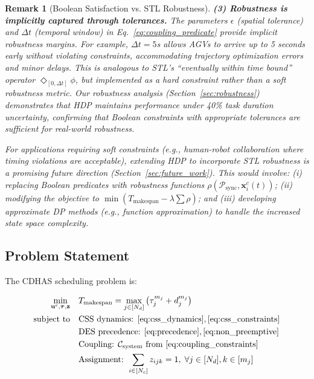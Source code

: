 \documentclass[manuscript,screen,review]{acmart}
\newtheorem{remark}{Remark}
\begin{document}
\begin{remark}[Boolean Satisfaction vs. STL Robustness]
\textbf{(3) Robustness is implicitly captured through tolerances.} The parameters 
$\epsilon$ (spatial tolerance) and $\Delta t$ (temporal window) in 
Eq.~\eqref{eq:coupling_predicate} provide \textit{implicit robustness margins}. 
For example, $\Delta t = 5$s allows AGVs to arrive up to 5 seconds early without 
violating constraints, accommodating trajectory optimization errors and minor 
delays. This is analogous to STL's ``eventually within time bound'' operator 
$\Diamond_{[0, \Delta t]} \phi$, but implemented as a hard constraint rather 
than a soft robustness metric. Our robustness analysis 
(Section~\ref{sec:robustness}) demonstrates that HDP maintains performance under 
40\% task duration uncertainty, confirming that Boolean constraints with 
appropriate tolerances are sufficient for real-world robustness.

For applications requiring soft constraints (e.g., human-robot collaboration 
where timing violations are acceptable), extending HDP to incorporate STL 
robustness is a promising future direction (Section~\ref{sec:future_work}). 
This would involve: (i) replacing Boolean predicates with robustness functions 
$\rho(\mathcal{P}_{\text{sync}}, \mathbf{x}_i^c(t))$; (ii) modifying the 
objective to $\min (T_{\text{makespan}} - \lambda \sum \rho)$; and (iii) 
developing approximate DP methods (e.g., function approximation) to handle the 
increased state space complexity.
\end{remark}

\subsection{Problem Statement}

The CDHAS scheduling problem is:

\begin{equation}
\begin{aligned}
\min_{\mathbf{u}^c, \boldsymbol{\tau}, \mathbf{z}} \quad & T_{\text{makespan}} = \max_{j \in [N_d]} \left( \tau_j^{m_j} + d_j^{m_j} \right) \\
\text{subject to} \quad & \text{CSS dynamics: } \eqref{eq:css_dynamics}, \eqref{eq:css_constraints} \\
& \text{DES precedence: } \eqref{eq:precedence}, \eqref{eq:non_preemptive} \\
& \text{Coupling: } \mathcal{C}_{\text{system}} \text{ from } \eqref{eq:coupling_constraints} \\
& \text{Assignment: } \sum_{i \in [N_c]} z_{ijk} = 1, \; \forall j \in [N_d], k \in [m_j]
\end{aligned}
\label{eq:cdhas_problem}
\end{equation}
\end{document}

